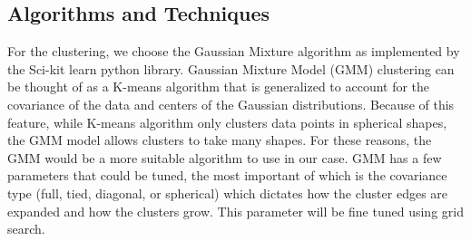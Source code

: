 \documentclass[journal,12pt,onecolumn,draftclsnofoot]{IEEEtran}  %
\begin{document}

%


\subsection{Algorithms and Techniques}
For the clustering, we choose the Gaussian Mixture algorithm as implemented by the Sci-kit learn python library. Gaussian Mixture Model (GMM) clustering can be thought of as a K-means algorithm that is generalized to account for the covariance of the data and centers of the Gaussian distributions. Because of this feature, while K-means algorithm only clusters data points in spherical shapes, the GMM model allows clusters to take many shapes. For these reasons, the GMM would be a more suitable algorithm to use in our case. GMM has a few parameters that could be tuned, the most important of which is the covariance type (full, tied, diagonal, or spherical) which dictates how the cluster edges are expanded and how the clusters grow. This parameter will be fine tuned using grid search. 
\end{document}
